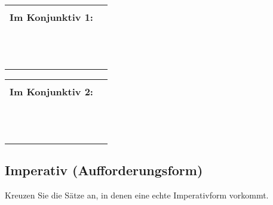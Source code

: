\documentclass[12pt,a4paper,twoside]{article}
\begin{document}
\begin{center}
  \begin{tabular}[h]{cp{}}
  &\\
  \textbf{Im Konjunktiv 1:} &\\\cline{2-2}
  &\\
  &\\\hline
  &\\
  &\\\hline
  &\\
  &\\\hline
  &\\
  &\\\hline
  &\\
  &\\\hline
  &\\
  &\\\hline
  \end{tabular}
\end{center}

\begin{center}
  \begin{tabular}[h]{cp{}}
  &\\
  \textbf{Im Konjunktiv 2:} &\\\cline{2-2}
  &\\
  &\\\hline
  &\\
  &\\\hline
  &\\
  &\\\hline
  &\\
  &\\\hline
  &\\
  &\\\hline
  &\\
  &\\\hline
  \end{tabular}
\end{center}


\subsection{ Imperativ (Aufforderungsform)}

Kreuzen Sie die Sätze an, in denen eine echte Imperativform vorkommt.
\end{document}

